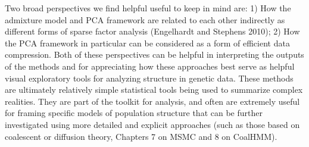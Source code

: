 \documentclass[smallextended]{svmult}       %
\begin{document}
Two broad perspectives we find helpful useful to keep in mind are: 1)
How the admixture model and PCA framework are related to each other
indirectly as different forms of sparse factor analysis (Engelhardt and
Stephens 2010); 2) How the PCA framework in particular can be considered
as a form of efficient data compression. Both of these perspectives can
be helpful in interpreting the outputs of the methods and for
appreciating how these approaches best serve as helpful visual
exploratory tools for analyzing structure in genetic data. These methods
are ultimately relatively simple statistical tools being used to
summarize complex realities. They are part of the toolkit for analysis,
and often are extremely useful for framing specific models of population
structure that can be further investigated using more detailed and
explicit approaches (such as those based on coalescent or diffusion
theory, Chapters 7 on MSMC and 8 on CoalHMM).



\end{document}

